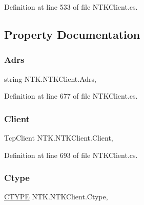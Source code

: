 Definition at line 533 of file N\+T\+K\+Client.\+cs.



\subsection{Property Documentation}
\mbox{\label{class_n_t_k_1_1_n_t_k_client_aa6efbe53a6200e155db4b630c7a87ed9}} 
\subsubsection{\texorpdfstring{Adrs}{Adrs}}
{\footnotesize\ttfamily string N\+T\+K.\+N\+T\+K\+Client.\+Adrs\hspace{0.3cm}{\ttfamily [get]}, {\ttfamily [set]}}







Definition at line 677 of file N\+T\+K\+Client.\+cs.

\mbox{\label{class_n_t_k_1_1_n_t_k_client_a09bd72900479a77f6039028a36146f8c}} 
\subsubsection{\texorpdfstring{Client}{Client}}
{\footnotesize\ttfamily Tcp\+Client N\+T\+K.\+N\+T\+K\+Client.\+Client\hspace{0.3cm}{\ttfamily [get]}, {\ttfamily [set]}}







Definition at line 693 of file N\+T\+K\+Client.\+cs.

\mbox{\label{class_n_t_k_1_1_n_t_k_client_aa4736ea1f9270931f394dc5c8a2ad646}} 
\subsubsection{\texorpdfstring{Ctype}{Ctype}}
{\footnotesize\ttfamily \mbox{\hyperlink{namespace_n_t_k_a8fa28c7c4270bbb81ee96b4f632fdbec}{C\+T\+Y\+PE}} N\+T\+K.\+N\+T\+K\+Client.\+Ctype\hspace{0.3cm}{\ttfamily [get]}, {\ttfamily [set]}}







